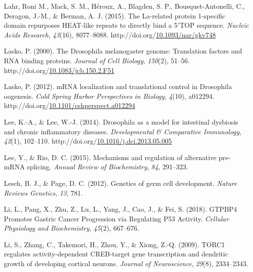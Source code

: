 \documentclass[12pt,oneside]{reedthesis}
\newlength{\cslhangindent}
\newenvironment{CSLReferences}[2] %
 {%
  \setlength{\parindent}{0pt}
  \ifodd #1 \everypar{\setlength{\hangindent}{\cslhangindent}}\ignorespaces\fi
  \ifnum #2 > 0
  \setlength{\parskip}{#2\baselineskip}
  \fi
 }%
 {}
\begin{document}
\begin{CSLReferences}{1}{0}
\leavevmode{}%
Lahr, Roni M., Mack, S. M., Héroux, A., Blagden, S. P., Bousquet-Antonelli, C., Deragon, J.-M., \& Berman, A. J. (2015). The {La}-related protein 1-specific domain repurposes {HEAT}-like repeats to directly bind a 5{\({'}\)}{TOP} sequence. \emph{Nucleic Acids Research}, \emph{43}(16), 8077--8088. http://doi.org/\href{https://doi.org/10.1093/nar/gkv748}{10.1093/nar/gkv748}

\leavevmode{}%
Lasko, P. (2000). The {Drosophila} melanogaster genome: {Translation} factors and {RNA} binding proteins. \emph{Journal of Cell Biology}, \emph{150}(2), 51--56. http://doi.org/\href{https://doi.org/10.1083/jcb.150.2.F51}{10.1083/jcb.150.2.F51}

\leavevmode{}%
Lasko, P. (2012). {mRNA} localization and translational control in {Drosophila} oogenesis. \emph{Cold Spring Harbor Perspectives in Biology}, \emph{4}(10), a012294. http://doi.org/\href{https://doi.org/10.1101/cshperspect.a012294}{10.1101/cshperspect.a012294}

\leavevmode{}%
Lee, K.-A., \& Lee, W.-J. (2014). Drosophila as a model for intestinal dysbiosis and chronic inflammatory diseases. \emph{Developmental \& Comparative Immunology}, \emph{42}(1), 102--110. http://doi.org/\href{https://doi.org/10.1016/j.dci.2013.05.005}{10.1016/j.dci.2013.05.005}

\leavevmode{}%
Lee, Y., \& Rio, D. C. (2015). Mechanisms and regulation of alternative pre-{mRNA} splicing. \emph{Annual Review of Biochemistry}, \emph{84}, 291--323.

\leavevmode{}%
Lesch, B. J., \& Page, D. C. (2012). Genetics of germ cell development. \emph{Nature Reviews Genetics}, \emph{13}, 781.

\leavevmode{}%
Li, L., Pang, X., Zhu, Z., Lu, L., Yang, J., Cao, J., \& Fei, S. (2018). {GTPBP4 Promotes Gastric Cancer Progression} via {Regulating P53 Activity}. \emph{Cellular Physiology and Biochemistry}, \emph{45}(2), 667--676.

\leavevmode{}%
Li, S., Zhang, C., Takemori, H., Zhou, Y., \& Xiong, Z.-Q. (2009). {TORC1} regulates activity-dependent {CREB}-target gene transcription and dendritic growth of developing cortical neurons. \emph{Journal of Neuroscience}, \emph{29}(8), 2334--2343.


\end{CSLReferences}
\end{document}

